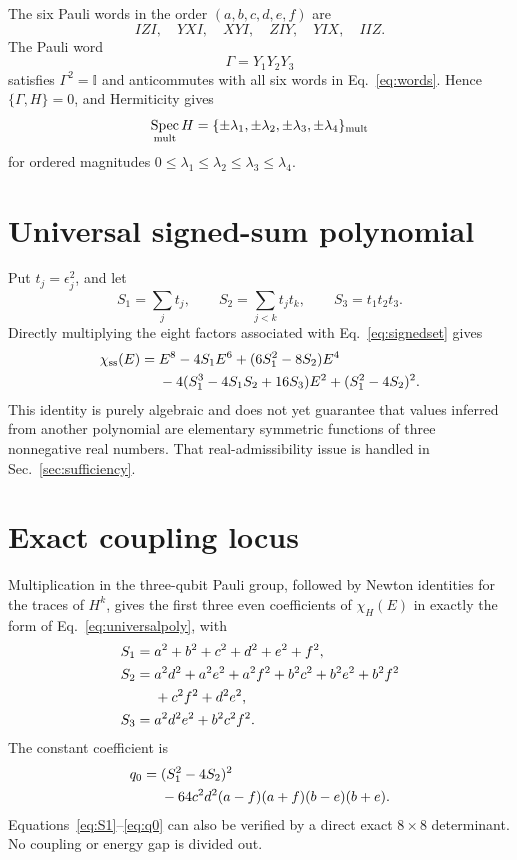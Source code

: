 \documentclass[
  aps,
  pra,
  reprint,
  superscriptaddress,
  nofootinbib,
  longbibliography
]{revtex4-2}
\DeclareMathOperator{\Spec}{Spec}
\newcommand{\I}{\mathbb{I}}
\begin{document}
The six Pauli words in the order \((a,b,c,d,e,f)\) are
\begin{equation}
 IZI,\quad YXI,\quad XYI,\quad ZIY,\quad YIX,\quad IIZ.
 \label{eq:words}
\end{equation}
The Pauli word
\begin{equation}
 \Gamma=Y_1Y_2Y_3
 \label{eq:gamma}
\end{equation}
satisfies \(\Gamma^2=\I\) and anticommutes with all six words in
Eq.~\eqref{eq:words}.  Hence \(\{\Gamma,H\}=0\), and Hermiticity gives
\begin{equation}
 \Spec_{\rm mult}H=\{\pm\lambda_1,\pm\lambda_2,
 \pm\lambda_3,\pm\lambda_4\}_{\rm mult}
 \label{eq:paired}
\end{equation}
for ordered magnitudes \(0\leq\lambda_1\leq\lambda_2\leq\lambda_3\leq\lambda_4\).

\section{Universal signed-sum polynomial}
\label{sec:universal}

Put \(t_j=\epsilon_j^2\), and let
\begin{equation}
 S_1=\sum_jt_j,\qquad
 S_2=\sum_{j<k}t_jt_k,\qquad
 S_3=t_1t_2t_3.
 \label{eq:Sdefs}
\end{equation}
Directly multiplying the eight factors associated with
Eq.~\eqref{eq:signedset} gives
\begin{align}
 \chi_{\rm ss}(E)
 ={}&E^8-4S_1E^6+(6S_1^2-8S_2)E^4 \notag\\
 &-4(S_1^3-4S_1S_2+16S_3)E^2
 +(S_1^2-4S_2)^2.
 \label{eq:universalpoly}
\end{align}
This identity is purely algebraic and does not yet guarantee that values inferred from
another polynomial are elementary symmetric functions of three nonnegative real
numbers.  That real-admissibility issue is handled in Sec.~\ref{sec:sufficiency}.

\section{Exact coupling locus}
\label{sec:locus}

Multiplication in the three-qubit Pauli group, followed by Newton identities for the
traces of \(H^k\), gives the first three even coefficients of \(\chi_H(E)\) in exactly
the form of Eq.~\eqref{eq:universalpoly}, with
\begin{align}
 S_1={}&a^2+b^2+c^2+d^2+e^2+f^2,
 \label{eq:S1}\\
 S_2={}&a^2d^2+a^2e^2+a^2f^2+b^2c^2+b^2e^2+b^2f^2
 \notag\\
 &{}+c^2f^2+d^2e^2,
 \label{eq:S2}\\
 S_3={}&a^2d^2e^2+b^2c^2f^2.
 \label{eq:S3}
\end{align}
The constant coefficient is
\begin{align}
 q_0={}&(S_1^2-4S_2)^2 \notag\\
 &{}-64c^2d^2(a-f)(a+f)(b-e)(b+e).
 \label{eq:q0}
\end{align}
Equations~\eqref{eq:S1}--\eqref{eq:q0} can also be verified by a direct exact
\(8\times8\) determinant.  No coupling or energy gap is divided out.
\end{document}
